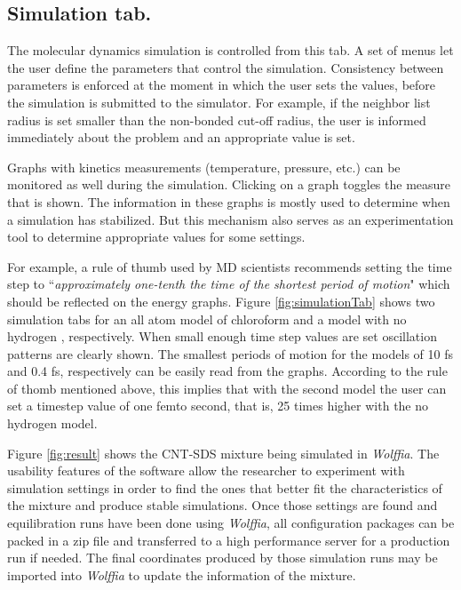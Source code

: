 \documentclass{article}
\begin{document}
\subsection{Simulation tab.}  The molecular dynamics simulation is controlled from this tab.  A set of menus let the user define the parameters that control the simulation.  Consistency between parameters is enforced at the moment in which the user sets the values, before the simulation is submitted to the simulator.  For example, if the neighbor list radius is set smaller than the non-bonded cut-off radius, the user is informed immediately about the problem and an appropriate value is set.

Graphs with kinetics measurements (temperature, pressure, etc.) can be monitored as well during the simulation.  Clicking on a graph toggles the measure that is shown.  The information in these graphs is mostly used to determine when a simulation has stabilized.  But this mechanism also serves as an experimentation tool to determine appropriate values for some settings.  

For example, a rule of thumb used by MD scientists recommends setting the time step to ``\textit{approximately one-tenth the time of the shortest period of motion}"\cite{Leach1997} which should be reflected on the energy graphs.  
Figure  \ref{fig:simulationTab} shows two simulation tabs for an all atom model of chloroform and a model with no hydrogen \cite{Lukyanov2010}, respectively.
When small enough time step values are set oscillation patterns are clearly shown.  The smallest periods of motion for the models of 10 fs and 0.4 fs, respectively can be easily read from the graphs.  According to the rule of thomb mentioned above, this implies that with the second model the user can set a timestep value of one femto second, that is, 25 times higher with the no hydrogen model.


Figure \ref{fig:result} shows the CNT-SDS mixture being simulated in \textit{Wolffia}.  The usability features of the software allow the researcher to experiment with simulation settings in order to find the ones that better fit the characteristics of the mixture and produce stable simulations.  Once those settings 
are found and equilibration runs have been done using \textit{Wolffia}, all configuration packages can be packed in a zip file and transferred to a high performance server for a production run if needed.  
The final coordinates produced by those simulation runs may be imported into \textit{Wolffia} to update the information of the mixture.
\end{document}
